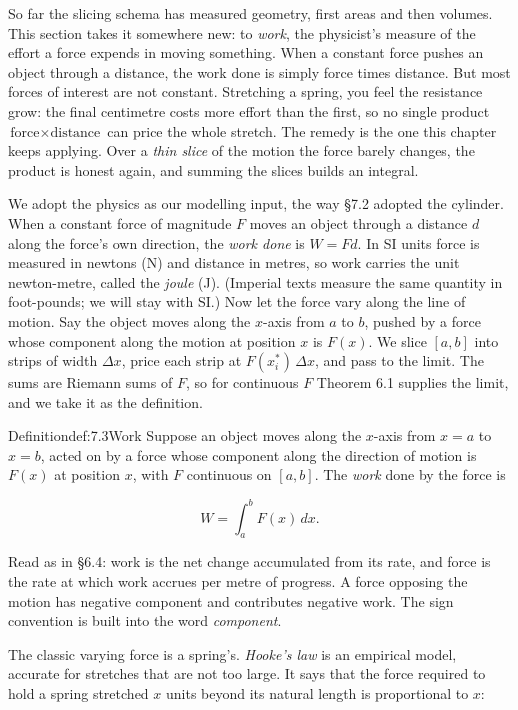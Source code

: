 \documentclass[a4paper,12pt,oneside]{memoir}
\begin{document}
So far the slicing schema has measured geometry, first areas and then volumes. This section takes it somewhere new: to \emph{work}, the physicist’s measure of the effort a force expends in moving something. When a constant force pushes an object through a distance, the work done is simply force times distance. But most forces of interest are not constant. Stretching a spring, you feel the resistance grow: the final centimetre costs more effort than the first, so no single product \(\text{force} \times \text{distance}\) can price the whole stretch. The remedy is the one this chapter keeps applying. Over a \emph{thin slice} of the motion the force barely changes, the product is honest again, and summing the slices builds an integral.

We adopt the physics as our modelling input, the way §7.2 adopted the cylinder. When a constant force of magnitude \(F\) moves an object through a distance \(d\) along the force’s own direction, the \emph{work done} is \(W = Fd\). In SI units force is measured in newtons (N) and distance in metres, so work carries the unit newton-metre, called the \emph{joule} (J). (Imperial texts measure the same quantity in foot-pounds; we will stay with SI.) Now let the force vary along the line of motion. Say the object moves along the \(x\)-axis from \(a\) to \(b\), pushed by a force whose component along the motion at position \(x\) is \(F(x)\). We slice \([a, b]\) into strips of width \(\Delta x\), price each strip at \(F(x_i^{*})\,\Delta x\), and pass to the limit. The sums are Riemann sums of \(F\), so for continuous \(F\) Theorem 6.1 supplies the limit, and we take it as the definition.

\begin{envdefinition}{Definition}{def:7.3}{Work}
Suppose an object moves along the \(x\)-axis from \(x = a\) to \(x = b\), acted on by a force whose component along the direction of motion is \(F(x)\) at position \(x\), with \(F\) continuous on \([a, b]\). The \emph{work} done by the force is

\[ W = \int_{a}^{b} F(x)\,dx. \]
\end{envdefinition}
Read as in §6.4: work is the net change accumulated from its rate, and force is the rate at which work accrues per metre of progress. A force opposing the motion has negative component and contributes negative work. The sign convention is built into the word \emph{component}.

The classic varying force is a spring’s. \emph{Hooke’s law} is an empirical model, accurate for stretches that are not too large. It says that the force required to hold a spring stretched \(x\) units beyond its natural length is proportional to \(x\):
\end{document}
